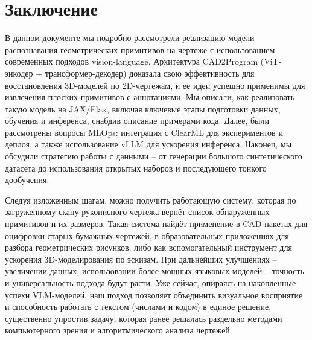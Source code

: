 \documentclass{article}
\begin{document}
\section*{Заключение}

В данном документе мы подробно рассмотрели реализацию модели распознавания геометрических примитивов на чертеже с использованием современных подходов vision-language. Архитектура CAD2Program (ViT-энкодер + трансформер-декодер) доказала свою эффективность для восстановления 3D-моделей по 2D-чертежам, и её идеи успешно применимы для извлечения плоских примитивов с аннотациями. Мы описали, как реализовать такую модель на JAX/Flax, включая ключевые этапы подготовки данных, обучения и инференса, снабдив описание примерами кода. Далее, были рассмотрены вопросы MLOps: интеграция с ClearML для экспериментов и деплоя, а также использование vLLM для ускорения инференса. Наконец, мы обсудили стратегию работы с данными – от генерации большого синтетического датасета до использования открытых наборов и последующего тонкого дообучения.

Следуя изложенным шагам, можно получить работающую систему, которая по загруженному скану рукописного чертежа вернёт список обнаруженных примитивов и их размеров. Такая система найдёт применение в CAD-пакетах для оцифровки старых бумажных чертежей, в образовательных приложениях для разбора геометрических рисунков, либо как вспомогательный инструмент для ускорения 3D-моделирования по эскизам. При дальнейших улучшениях – увеличении данных, использовании более мощных языковых моделей – точность и универсальность подхода будут расти. Уже сейчас, опираясь на накопленные успехи VLM-моделей, наш подход позволяет объединить визуальное восприятие и способность работать с текстом (числами и кодом) в единое решение, существенно упростив задачу, которая ранее решалась раздельно методами компьютерного зрения и алгоритмического анализа чертежей.
\end{document}
